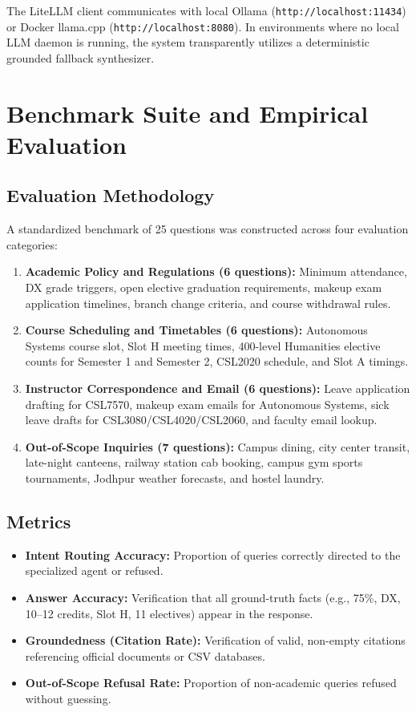 \documentclass[10pt,a4paper]{article}
\begin{document}
The LiteLLM client communicates with local Ollama (\texttt{http://localhost:11434}) or Docker llama.cpp (\texttt{http://localhost:8080}). In environments where no local LLM daemon is running, the system transparently utilizes a deterministic grounded fallback synthesizer.

\section{Benchmark Suite and Empirical Evaluation}
\subsection{Evaluation Methodology}
A standardized benchmark of 25 questions was constructed across four evaluation categories:
\begin{enumerate}[noitemsep]
    \item \textbf{Academic Policy and Regulations (6 questions):} Minimum attendance, DX grade triggers, open elective graduation requirements, makeup exam application timelines, branch change criteria, and course withdrawal rules.
    \item \textbf{Course Scheduling and Timetables (6 questions):} Autonomous Systems course slot, Slot H meeting times, 400-level Humanities elective counts for Semester 1 and Semester 2, CSL2020 schedule, and Slot A timings.
    \item \textbf{Instructor Correspondence and Email (6 questions):} Leave application drafting for CSL7570, makeup exam emails for Autonomous Systems, sick leave drafts for CSL3080/CSL4020/CSL2060, and faculty email lookup.
    \item \textbf{Out-of-Scope Inquiries (7 questions):} Campus dining, city center transit, late-night canteens, railway station cab booking, campus gym sports tournaments, Jodhpur weather forecasts, and hostel laundry.
\end{enumerate}

\subsection{Metrics}
\begin{itemize}[noitemsep]
    \item \textbf{Intent Routing Accuracy:} Proportion of queries correctly directed to the specialized agent or refused.
    \item \textbf{Answer Accuracy:} Verification that all ground-truth facts (e.g., 75\%, DX, 10--12 credits, Slot H, 11 electives) appear in the response.
    \item \textbf{Groundedness (Citation Rate):} Verification of valid, non-empty citations referencing official documents or CSV databases.
    \item \textbf{Out-of-Scope Refusal Rate:} Proportion of non-academic queries refused without guessing.
\end{itemize}
\end{document}
